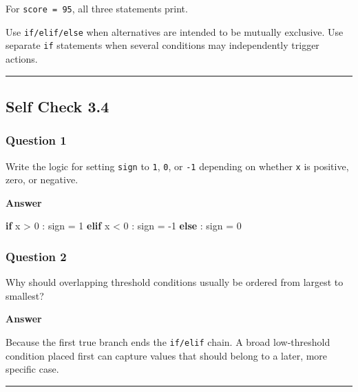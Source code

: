 \documentclass[
  11pt,
  a4paper,
]{article}
\newenvironment{Shaded}{}{}
\newcommand{\ControlFlowTok}[1]{\textcolor[rgb]{0.00,0.44,0.13}{\textbf{#1}}}
\newcommand{\DecValTok}[1]{\textcolor[rgb]{0.25,0.63,0.44}{#1}}
\newcommand{\NormalTok}[1]{#1}
\newcommand{\OperatorTok}[1]{\textcolor[rgb]{0.40,0.40,0.40}{#1}}
\begin{document}
For \texttt{score\ =\ 95}, all three statements print.

Use \texttt{if/elif/else} when alternatives are intended to be mutually
exclusive. Use separate \texttt{if} statements when several conditions
may independently trigger actions.

\begin{center}\rule{0.5\linewidth}{0.5pt}\end{center}

\subsection{Self Check 3.4}\label{self-check-3.4}

\subsubsection{Question 1}\label{question-1-3}

Write the logic for setting \texttt{sign} to \texttt{1}, \texttt{0}, or
\texttt{-1} depending on whether \texttt{x} is positive, zero, or
negative.

\textbf{Answer}

\begin{Shaded}
\begin{Highlighting}[]
\ControlFlowTok{if}\NormalTok{ x }\OperatorTok{\textgreater{}} \DecValTok{0}\NormalTok{ :}
\NormalTok{    sign }\OperatorTok{=} \DecValTok{1}
\ControlFlowTok{elif}\NormalTok{ x }\OperatorTok{\textless{}} \DecValTok{0}\NormalTok{ :}
\NormalTok{    sign }\OperatorTok{=} \OperatorTok{{-}}\DecValTok{1}
\ControlFlowTok{else}\NormalTok{ :}
\NormalTok{    sign }\OperatorTok{=} \DecValTok{0}
\end{Highlighting}
\end{Shaded}

\subsubsection{Question 2}\label{question-2-3}

Why should overlapping threshold conditions usually be ordered from
largest to smallest?

\textbf{Answer}

Because the first true branch ends the \texttt{if/elif} chain. A broad
low-threshold condition placed first can capture values that should
belong to a later, more specific case.

\begin{center}\rule{0.5\linewidth}{0.5pt}\end{center}
\end{document}
